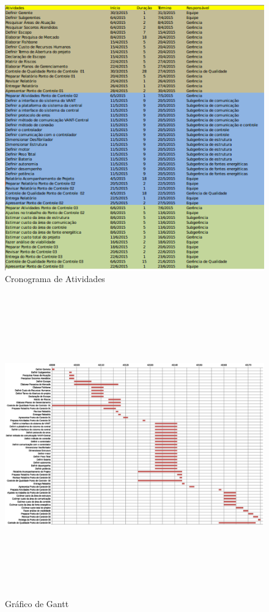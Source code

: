  \begin{figure}[!ht]

	\centering
		\includegraphics[keepaspectratio=true,scale=0.9]{figuras/cronograma.png}
	\caption{Cronograma de Atividades}
	\label{fig:cronograma}
\end{figure}

\pagebreak
 \begin{figure}[H]
	\flushleft
		\includegraphics[height=13cm,width=18cm]{figuras/gantt.eps}
	\caption{Gráfico de Gantt}
	\label{fig:gantt}
\end{figure}
